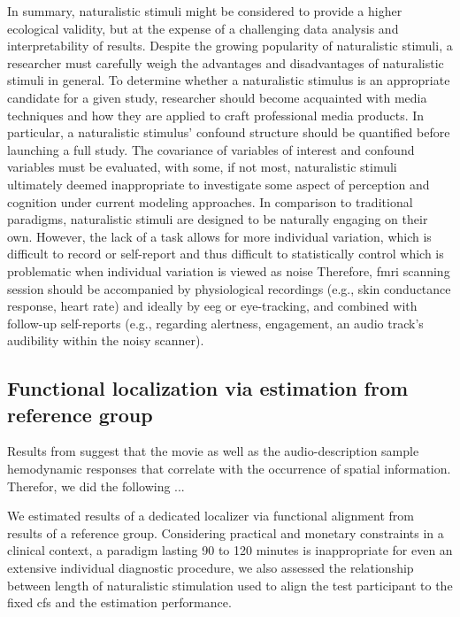 %
In summary, naturalistic stimuli might be considered to provide a higher
ecological validity, but at the expense of a challenging data analysis and
interpretability of results.
%
Despite the growing popularity of naturalistic stimuli, a researcher must
carefully weigh the advantages and disadvantages of naturalistic stimuli in
general.
%
To determine whether a naturalistic stimulus is an appropriate candidate for a
given study, researcher should become acquainted with media techniques and how
they are applied to craft professional media products.
%
In particular, a naturalistic stimulus' confound structure should be quantified
before launching a full study.
%
The covariance of variables of interest and confound variables must be
evaluated, with some, if not most, naturalistic stimuli ultimately deemed
inappropriate to investigate some aspect of perception and cognition under
current modeling approaches.
%
In comparison to traditional paradigms, naturalistic stimuli are designed to be
naturally engaging on their own.
%
However, the lack of a task allows for more individual variation, which is
difficult to record or self-report and thus difficult to statistically
control which is problematic when individual variation is viewed as noise
%
Therefore, \ac{fmri} scanning session should be accompanied by physiological
recordings (e.g., skin conductance response, heart rate) and ideally by
\ac{eeg} or eye-tracking, and combined with follow-up self-reports (e.g.,
regarding alertness, engagement, an audio track's audibility within the noisy
scanner).



\subsection{Functional localization via estimation from reference group}



%
Results from \citet{haeusler2022processing} suggest that the movie as well as
the audio-description sample hemodynamic responses that correlate with the
occurrence of spatial information.
%
Therefor, we did the following ...

We estimated results of a dedicated localizer \citep{sengupta2016extension} via
functional alignment from results of a reference group.
Considering practical and monetary constraints in a clinical context, a paradigm
lasting 90 to 120 minutes is inappropriate for even an extensive individual
diagnostic procedure, we also assessed the relationship between length of
naturalistic stimulation used to align the test participant to the fixed
\ac{cfs} and the estimation performance.



